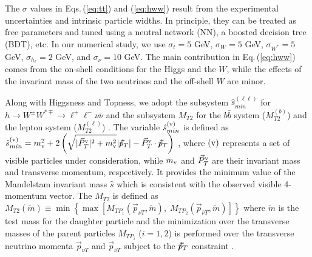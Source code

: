The $\sigma$ values in Eqs.\,(\ref{eq:tt}) and (\ref{eq:hww}) result from the experimental uncertainties and intrinsic particle widths. In principle, they can be treated as free parameters and tuned using a neutral network (NN), a boosted decision tree (BDT), etc. In our numerical study, we use $\sigma_t=5$ GeV, $\sigma_W=5$ GeV, $\sigma_{W^*}=5$ GeV, $\sigma_{h_\ell}=2$ GeV, and $\sigma_\nu = 10 $ GeV. 
The main contribution in Eq.\,(\ref{eq:hww}) comes from the on-shell conditions for the Higgs and the $W$, while the effects of the invariant mass of the two neutrinos and the off-shell $W$ are minor. 

Along with Higgsness and Topness, we adopt the subsystem $\hat{s}_{min}^{(\ell\ell)}$ for $h \to W^\pm W^{*\mp}\to\ell^+\ell^- \nu \bar \nu$ \cite{Konar:2008ei,Konar:2010ma} and the subsystem $M_{T2}$ for the $b \bar b$ system ($M_{T2}^{(b)}$) and the lepton system ($M_{T2}^{(\ell)}$) \cite{Burns:2008va}. 
%
The variable $ \hat{s}_{min}^{({\rm v})} $ is defined as $ \hat{s}_{min}^{({\rm v})} = m_{{\rm v}}^2 + 2 \left ( \sqrt{ |\vec P_{T}^{\rm v} |^2 + m_{\rm v}^2 }  |\mptvec| - \vec P_{T}^{\rm v} \cdot \mptvec \right )$ \cite{Konar:2008ei,Konar:2010ma,Barr:2011xt}, where $({\rm v})$ represents a set of visible particles under consideration, while $m_{\rm v}$ and $\vec P_{T}^{\rm v}$ are their invariant mass and transverse momentum, respectively. It provides the minimum value of the Mandelstam invariant mass $\hat s$ which is consistent with the observed visible 4-momentum vector.
%
The $M_{T2}$ is defined as 
$M_{T2} (\tilde m) \equiv \min\left\{\max\left[M_{TP_1}(\vec{p}_{\nu T},\tilde m),\;M_{TP_2} (\vec{p}_{\bar\nu T},\tilde m)\right] \right\}$ where $\tilde m$  is the test mass for the daughter particle and the minimization over the transverse masses of the parent particles $M_{TP_i}$ ($i=1, 2$) is performed over the transverse neutrino momenta $\vec{p}_{\nu T}$ and $\vec{p}_{\bar\nu T}$ subject to the 
${/\!\!\!\vec{ p}_T} $ constraint  \cite{Lester:1999tx,Burns:2008va,Barr:2011xt,Debnath:2017ktz,Konar:2009wn,Konar:2009qr,Cho:2007qv}. 



